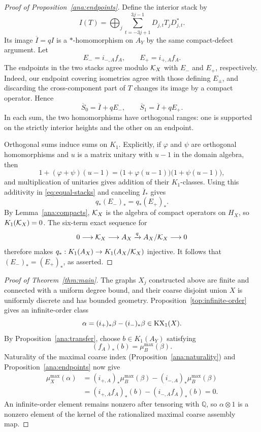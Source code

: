 \begin{proof}[Proof of Proposition~\ref{ana:endpoints}]
Define the interior stack by
\[
 I(T)=\bigoplus_j\sum_{t=-3j+1}^{3j-1}D_{j,t}T_jD_{j,t}^*.
\]
Its image $\overline I=qI$ is a $*$-homomorphism on $A_Y$ by the
same compact-defect argument.  Let
\[
 E_-=i_{-,A}f_A,\qquad E_+=i_{+,A}f_A.
\]
The endpoints in the two stacks agree modulo $\mathcal K_X$ with $E_-$ and
$E_+$, respectively.  Indeed, our endpoint covering isometries agree
with those defining $E_\pm$, and discarding the cross-component part
of $T$ changes its image by a compact operator.  Hence
\[
 \overline S_0=\overline I+qE_-,\qquad
 \overline S_1=\overline I+qE_+.
\]
In each sum, the two homomorphisms have orthogonal ranges: one is
supported on the strictly interior heights and the other on an
endpoint.

Orthogonal sums induce sums on $K_1$.  Explicitly, if $\varphi$ and
$\psi$ are orthogonal homomorphisms and $u$ is a matrix unitary with
$u-1$ in the domain algebra, then
\[
 1+(\varphi+\psi)(u-1)
   =\bigl(1+\varphi(u-1)\bigr)
      \bigl(1+\psi(u-1)\bigr),
\]
and multiplication of unitaries gives addition of their $K_1$-classes.
Using this additivity in \eqref{eq:equal-stacks} and canceling
$\overline I_*$ gives
\[
 q_*(E_-)_*=q_*(E_+)_*.
\]
By Lemma~\ref{ana:compacts}, $\mathcal K_X$ is the algebra of compact
operators on $H_X$, so $K_1(\mathcal K_X)=0$.  The six-term exact sequence
for
\[
 0\longrightarrow\mathcal K_X\longrightarrow A_X
       \xrightarrow{q}A_X/\mathcal K_X\longrightarrow0
\]
therefore makes $q_*:K_1(A_X)\to K_1(A_X/\mathcal K_X)$ injective.
It follows that $(E_-)_*=(E_+)_*$, as asserted.
\end{proof}

\begin{proof}[Proof of Theorem~\ref{thm:main}]
The graphs $X_j$ constructed above are finite and connected with a
uniform degree bound, and their coarse disjoint union $X$ is uniformly
discrete and has bounded geometry.  Proposition~\ref{top:infinite-order}
gives an infinite-order class
\[
 \alpha=(i_+)_*\beta-(i_-)_*\beta\in\operatorname{KX}_1(X).
\]
By Proposition~\ref{ana:transfer}, choose $b\in K_1(A_Y)$ satisfying
\[
 (f_A)_*(b)=\mu_B^{\max}(\beta).
\]
Naturality of the maximal coarse index
(Proposition~\ref{ana:naturality}) and
Proposition~\ref{ana:endpoints} now give
\begin{align*}
 \mu_X^{\max}(\alpha)
  &=(i_{+,A})_*\mu_B^{\max}(\beta)
       -(i_{-,A})_*\mu_B^{\max}(\beta)\\
  &=(i_{+,A}f_A)_*(b)-(i_{-,A}f_A)_*(b)=0.
\end{align*}
An infinite-order element remains nonzero after tensoring with
$\mathbb Q$, so $\alpha\otimes1$ is a nonzero element of the kernel
of the rationalized maximal coarse assembly map.
\end{proof}
